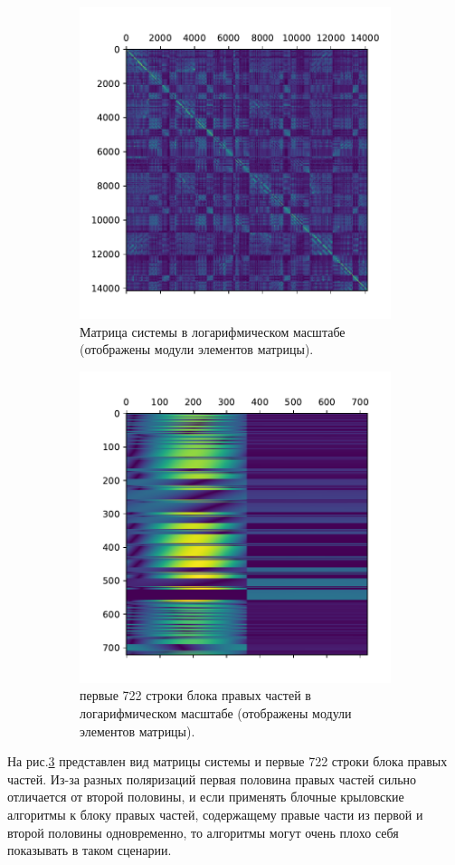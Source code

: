 \begin{figure}[H] 
    \begin{subfigure}{.5\textwidth}
        \centering
        \includegraphics[width=0.7\linewidth]{images/mat.pdf}
        \caption{Матрица системы в логарифмическом масштабе (отображены модули элементов матрицы).}
        \label{fig:matrix}
    \end{subfigure}
    \begin{subfigure}{.5\textwidth}
        \centering
        \includegraphics[width=0.7\linewidth]{images/rhs.pdf}
        \caption{первые 722 строки блока правых частей в логарифмическом масштабе (отображены модули элементов матрицы).}
        \label{fig:rhs}
    \end{subfigure}
    \caption{}
    \label{fig:matrixnrhs}
\end{figure} 
 На рис.\ref{fig:matrixnrhs} представлен вид матрицы системы и первые 722 строки блока
 правых частей. Из-за разных поляризаций первая половина правых частей сильно отличается от второй половины, и 
 если применять блочные крыловские алгоритмы к блоку правых частей, содержащему правые части из первой и второй половины
 одновременно, то алгоритмы могут очень плохо себя показывать в таком сценарии.

